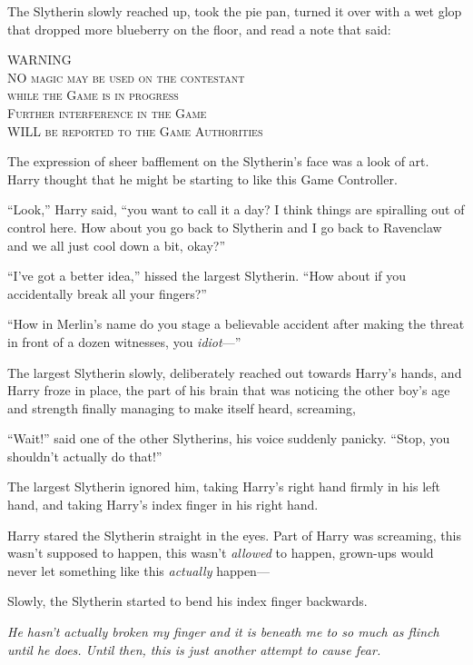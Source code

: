The Slytherin slowly reached up, took the pie pan, turned it over with a wet glop that dropped more blueberry on the floor, and read a note that said: \begin{center} \scshape \MakeUppercase{Warning}\\ \MakeUppercase{No} magic may be used on the contestant\\ while the Game is in progress\\ Further interference in the Game\\ \MakeUppercase{will} be reported to the Game Authorities \end{center}

The expression of sheer bafflement on the Slytherin’s face was a look of art. Harry thought that he might be starting to like this Game Controller.

“Look,” Harry said, “you want to call it a day? I think things are spiralling out of control here. How about you go back to Slytherin and I go back to Ravenclaw and we all just cool down a bit, okay?”

“I’ve got a better idea,” hissed the largest Slytherin. “How about if you accidentally break all your fingers?”

“How in Merlin’s name do you stage a believable accident after making the threat in front of a dozen witnesses, you \emph{idiot}—”

The largest Slytherin slowly, deliberately reached out towards Harry’s hands, and Harry froze in place, the part of his brain that was noticing the other boy’s age and strength finally managing to make itself heard, screaming, 

“Wait!” said one of the other Slytherins, his voice suddenly panicky. “Stop, you shouldn’t actually do that!”

The largest Slytherin ignored him, taking Harry’s right hand firmly in his left hand, and taking Harry’s index finger in his right hand.

Harry stared the Slytherin straight in the eyes. Part of Harry was screaming, this wasn’t supposed to happen, this wasn’t \emph{allowed} to happen, grown-ups would never let something like this \emph{actually} happen—

Slowly, the Slytherin started to bend his index finger backwards.

\emph{He hasn’t actually broken my finger and it is beneath me to so much as flinch until he does. Until then, this is just another attempt to cause fear.}

